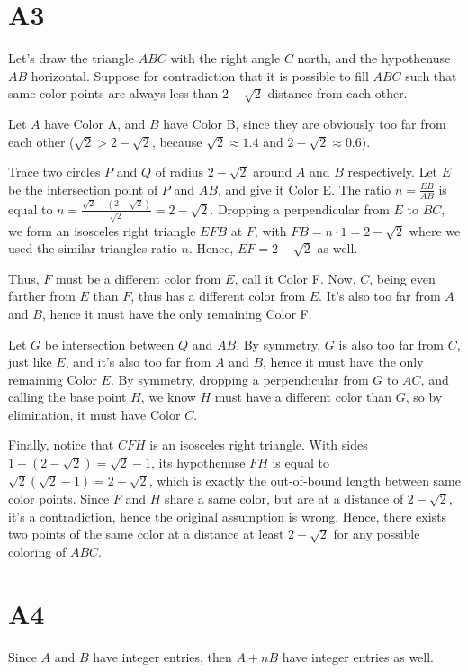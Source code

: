 \documentclass{book}
\begin{document}
\section*{A3}
Let's draw the triangle $ABC$ with the right angle $C$ north, and the hypothenuse $AB$ horizontal. Suppose for contradiction that it is possible to fill $ABC$ such that same color points are always less than $2 - \sqrt{2}$ distance from each other.

Let $A$ have Color A, and $B$ have Color B, since they are obviously too far from each other ($\sqrt{2} > 2 - \sqrt{2}$, because $\sqrt{2} \approx 1.4$ and $2 - \sqrt{2} \approx 0.6)$.

Trace two circles $P$ and $Q$ of radius $2 - \sqrt{2}$ around $A$ and $B$ respectively. Let $E$ be the intersection point of $P$ and $AB$, and give it Color E. The ratio $n = \frac{EB}{AB}$ is equal to $n = \frac{\sqrt{2} - (2 - \sqrt{2})}{\sqrt{2}} = 2 - \sqrt{2}$. Dropping a perpendicular from $E$ to $BC$, we form an isosceles right triangle $EFB$ at $F$, with $FB = n \cdot 1 = 2 - \sqrt{2}$ where we used the similar triangles ratio $n$. Hence, $EF = 2 - \sqrt{2}$ as well.

Thus, $F$ must be a different color from $E$, call it Color F. Now, $C$, being even farther from $E$ than $F$, thus has a different color from $E$. It's also too far from $A$ and $B$, hence it must have the only remaining Color F.

Let $G$ be intersection between $Q$ and $AB$. By symmetry, $G$ is also too far from $C$, just like $E$, and it's also too far from $A$ and $B$, hence it must have the only remaining Color $E$. By symmetry, dropping a perpendicular from $G$ to $AC$, and calling the base point $H$, we know $H$ must have a different color than $G$, so by elimination, it must have Color $C$.

Finally, notice that $CFH$ is an isosceles right triangle. With sides $1 - (2 - \sqrt{2}) = \sqrt{2} - 1$, its hypothenuse $FH$ is equal to $\sqrt{2}(\sqrt{2} - 1) = 2 - \sqrt{2}$, which is exactly the out-of-bound length between same color points. Since $F$ and $H$ share a same color, but are at a distance of $2 - \sqrt{2}$, it's a contradiction, hence the original assumption is wrong. Hence, there exists two points of the same color at a distance at least $2 - \sqrt{2}$ for any possible coloring of $ABC$.

\section*{A4}
Since $A$ and $B$ have integer entries, then $A + nB$ have integer entries as well.
\end{document}
